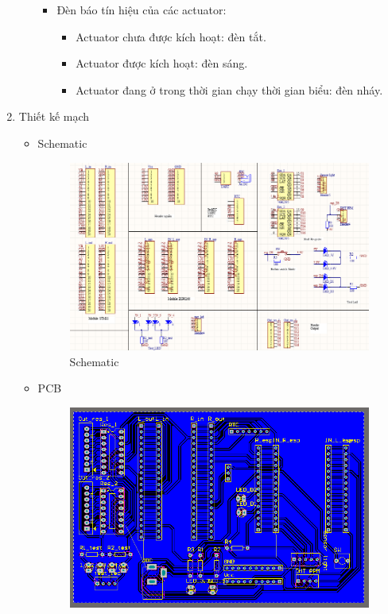 \documentclass[a4paper,12pt,oneside]{article}
\begin{document}
\begin{enumerate}
\begin{itemize}
\begin{itemize}
\begin{itemize}
		\end{itemize}
		\item Đèn báo tín hiệu của các actuator:
		\begin{itemize}
		\item Actuator chưa được kích hoạt: đèn tắt.
		\item Actuator được kích hoạt: đèn sáng.
		\item Actuator đang ở trong  thời gian chạy thời gian biểu: đèn nháy.
		\end{itemize}
		\end{itemize}
	\end{itemize}
	\item Thiết kế mạch
	\begin{itemize}
		\item Schematic
			\begin{figure}[H]
			\centering
			\begin{center}
			\includegraphics[scale=.7]{hinh/schematic.PNG}
			\end{center}
			\caption{Schematic}
			\end{figure}
		\item PCB
			\begin{figure}[H]
			\centering
			\begin{center}
			\includegraphics[scale=.9]{hinh/pcb_board.PNG}

\end{center}
\end{figure}
\end{itemize}
\end{enumerate}
\end{document}
